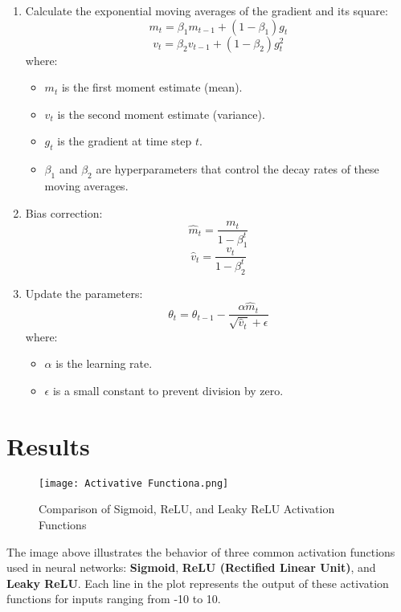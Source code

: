 \documentclass{article}
\begin{document}
\begin{enumerate}
    \item Calculate the exponential moving averages of the gradient and its square:
    \[
    m_t = \beta_1 m_{t-1} + (1 - \beta_1) g_t
    \]
    \[
    v_t = \beta_2 v_{t-1} + (1 - \beta_2) g_t^2
    \]
    where:
    \begin{itemize}
        \item \( m_t \) is the first moment estimate (mean).
        \item \( v_t \) is the second moment estimate (variance).
        \item \( g_t \) is the gradient at time step \( t \).
        \item \( \beta_1 \) and \( \beta_2 \) are hyperparameters that control the decay rates of these moving averages.
    \end{itemize}

    \item Bias correction:
    \[
    \hat{m}_t = \frac{m_t}{1 - \beta_1^t}
    \]
    \[
    \hat{v}_t = \frac{v_t}{1 - \beta_2^t}
    \]

    \item Update the parameters:
    \[
    \theta_t = \theta_{t-1} - \frac{\alpha \hat{m}_t}{\sqrt{\hat{v}_t} + \epsilon}
    \]
    where:
    \begin{itemize}
        \item \( \alpha \) is the learning rate.
        \item \( \epsilon \) is a small constant to prevent division by zero.
    \end{itemize}
\end{enumerate}


\section{Results}

\clearpage

\begin{figure}[h]
    \centering
    \texttt{[image: Activative Functiona.png]}
    \caption{Comparison of Sigmoid, ReLU, and Leaky ReLU Activation Functions}
    \label{fig:activation_functions}
\end{figure}

The image above illustrates the behavior of three common activation functions used in neural networks: \textbf{Sigmoid}, \textbf{ReLU (Rectified Linear Unit)}, and \textbf{Leaky ReLU}. Each line in the plot represents the output of these activation functions for inputs ranging from -10 to 10.
\end{document}
